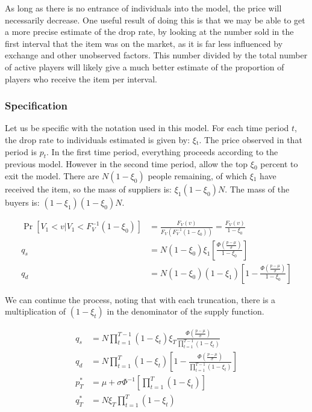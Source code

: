 \documentclass[12pt, letterpaper]{paper}
\begin{document}
As long as there is no entrance of individuals into the model, the
price will necessarily decrease. One useful result of doing this is
that we may be able to get a more precise estimate of the drop rate,
by looking at the number sold in the first interval that the item was
on the market, as it is far less influenced by exchange and other
unobserved factors. This number divided by the total number of active
players will likely give a much better estimate of the proportion of
players who receive the item per interval.

\subsubsection{Specification}
\label{sec-2-3-1}

Let us be specific with the notation used in this model. For each time
period $t$, the drop rate to individuals estimated is given by: $\xi$$_{\text{t}}$. The
price observed in that period is $p_t$. In the first time period,
everything proceeds according to the previous model. However in the
second time period, allow the top $\xi$$_{\text{0}}$ percent to exit the
model. There are $N(1-\xi_0)$ people remaining, of which $\xi$$_{\text{1}}$ have received
the item, so the mass of suppliers is: $\xi_1 (1-\xi_0)N$. The mass of the
buyers is: $(1-\xi_1)(1-\xi_0)N$. 

\begin{align*}
\Pr \left [ V_1 < v | V_1 < F_V^{-1}( 1 - \xi_0 )^{} \right ] &=
\frac { F_V ( v ) }{  F_V ( F_V^{-1} ( 1 - \xi_0 ) ) } = \frac{ F_V (v)
}{1 - \xi_0}\\
q_s &= N ( 1-\xi_0 )\xi_1 \left [ \frac{\Phi \left ( \frac{ p - \mu }{\sigma} \right )}{ 1 - \xi_0 } \right ]\\
q_d &= N ( 1-\xi_0 )(1-\xi_1) \left [ 1 - \frac{ \Phi \left ( \frac{
p - \mu }{ \sigma } \right ) }{ 1 - \xi_0 } \right ]
\end{align*}

We can continue the process, noting that with each truncation, there
is a multiplication of $(1-\xi_t)$ in the denominator of the supply
function.

\begin{align*}
q_s &= N \prod_{t=1}^{T-1} (1-\xi_t ) \xi_T \frac{\Phi \left ( \frac{ p - \mu }{\sigma} \right )}{ \prod_{t=1}^{T-1} ( 1 - \xi_t ) }\\
q_d &= N \prod_{t=1}^{T} ( 1- \xi_t ) \left [ 1 - \frac{ \Phi \left ( \frac{
p - \mu }{ \sigma } \right ) }{ \prod_{t=1}^{T-1} (1 - \xi_t ) } \right ]\\
p_T^* &= \mu + \sigma \Phi^{-1} \left [ \prod_{t=1}^T ( 1 - \xi_t ) \right ]\\
q_T^* &= N \xi_T \prod_{t=1}^T ( 1 - \xi_t )\\
\end{align*}
\end{document}
